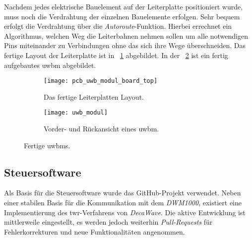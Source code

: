 Nachdem jedes elektrische Bauelement auf der Leiterplatte positioniert wurde, muss noch die Verdrahtung der einzelnen Bauelemente erfolgen. Sehr bequem erfolgt die Verdrahtung über die \textit{Autoroute}-Funktion. Hierbei errechnet ein Algorithmus, welchen Weg die Leiterbahnen nehmen sollen um alle notwendigen Pins miteinander zu Verbindungen ohne das sich ihre Wege überschneiden. Das fertige Layout der Leiterplatte ist in \figurename~\ref{fig:pcb_uwb_modul_board_top} abgebildet. In der \figurename~\ref{fig:uwb_modul} ist ein fertig aufgebautes \Gls{uwbm} abgebildet.


%

\begin{figure}
	\begin{subfigure}[t]{0.3\textwidth}
		\texttt{[image: pcb\_uwb\_modul\_board\_top]}
		\caption{Das fertige Leiterplatten Layout.}
		\label{fig:pcb_uwb_modul_board_top}
	\end{subfigure}
	\hfill
	\begin{subfigure}[t]{0.6\textwidth}
		\centering
		\texttt{[image: uwb\_modul]}
		\caption{Vorder- und Rückansicht eines \gls{uwbm}.}
		\label{fig:uwb_modul}
	\end{subfigure}
	\caption{Fertige \glspl{uwbm}.}
	\label{fig:fertige_uwb_module}
\end{figure}


%
%
\subsection{Steuersoftware}

Als Basis für die Steuersoftware wurde das GitHub-Projekt \cite{Trojer2015} verwendet. Neben einer stabilen Basis für die Kommunikation mit dem \textit{DWM1000}, existiert eine Implementierung des \Gls{twr}-Verfahrens von \textit{DecaWave}. Die aktive Entwicklung ist mittlerweile eingestellt, es werden jedoch weiterhin \textit{Pull-Requests\footnotemark} für Fehlerkorrekturen und neue Funktionalitäten angenommen.

